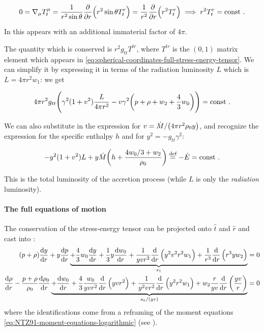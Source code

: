\documentclass[main.tex]{subfiles}
\begin{document}
\begin{equation}
  0=\nabla_\mu T_t^{\mu}
  = \frac{1}{r^2 \sin \theta} \pdv{}{r} \qty(r^2 \sin\theta T_t^{r})
  = \frac{1}{r^2} \pdv{}{r} \qty(r^2 T_t^{r})
  \implies
  r^2 T_t^{r} = \const \,.
\end{equation}

In \cite[before eq. 18c]{ThorneFLammmangZytkow:1981feb} this appears with an additional immaterial factor of \(4 \pi\).

The quantity which is conserved is \(r^2 g_{tt}T^{tr}\), where \(T^{tr}\) is the $(0,1)$ matrix element which appears in \eqref{eq:spherical-coordinates-full-stress-energy-tensor}. We can simplify it by expressing it in terms of the radiation luminosity \(L\) which is \(L = 4 \pi r^2 w_1\): we get

\begin{equation}
  4 \pi r^2 g_{tt} \qty(\gamma^2 (1+ v^2) \frac{L}{4 \pi r^2} - v \gamma^2 \qty(p + \rho + w_2 + \frac{4}{3} w_0)) = \const\,.
\end{equation}

We can also substitute in the expression for \(v = \dot{M} / \qty(4 \pi r^2 \rho_0 y) \), and recognize the expression for the specific enthalpy \(h\) and for \(y^2 =- g_{tt} \gamma^2\):

\begin{equation}
    -y^2 (1+v^2) L + y \dot{M} \qty(h + \frac{4w_0/3 + w_2}{\rho_0}) \defeq -\dot{E}
    = \const\,.
\end{equation}

This is the total luminosity of the accretion process (while \(L\) is only the \emph{radiation} luminosity).

\paragraph{The full equations of motion}

The conservation of the stress-energy tensor can be projected onto \(\hat{t}\) and \(\hat{r}\) and cast into \cite[eq. A7]{NobiliTurollaZampieri:1991dec}:
%
\begin{subequations} \label{eq:fiducial-projected-conservation}
\begin{align}
    (p+\rho) \dv{y}{r}
    +y \dv{p}{r}
    \underbrace{
    +\frac{4}{3} w_{0} \dv{y}{r}
    +\frac{1}{3} y \dv{w_0}{r}
    +\frac{1}{y v r^{2}} \dv{}{r}\left(y^{2} v^{2} r^{2} w_{1}\right)
    +\frac{1}{r^{3}} \dv{}{r}\left(r^{3} y w_{2}\right)}_{s_1} &=0 \\
    \dv{\rho}{r}
    -\frac{p+\rho}{\rho_{0}}
    \dv{\rho_{0}}{r}
    \underbrace{
    +\dv{w_0}{r}
    +\frac{4}{3} \frac{w_{0}}{y v r^{2}} \dv{}{r}\left(y v r^{2}\right)
    +\frac{1}{y^{2} v r^{2}} \dv{}{r}\left(y^{2} r^{2} w_{1}\right)
    +w_{2} \frac{r}{y v} \dv{}{r}\left(\frac{y v}{r}\right)}_{s_0/(yv)} &=0
\end{align}
\end{subequations}
%
where the identifications come from a reframing of the moment equations \eqref{eq:NTZ91-moment-equations-logarithmic} (see \cite[eq. A8]{NobiliTurollaZampieri:1991dec}).
\end{document}
